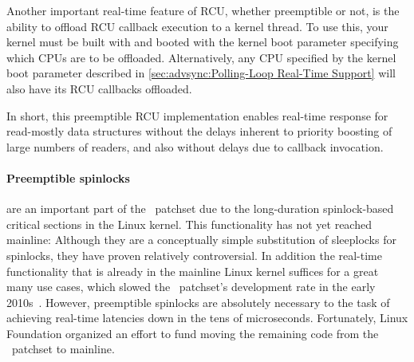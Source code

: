 \QuickQuizEnd

Another important real-time feature of RCU, whether preemptible or
not, is the ability to offload RCU callback execution to a kernel
thread.
To use this, your kernel must be built with 
and booted with the  kernel boot parameter specifying
which CPUs are to be offloaded.
Alternatively, any CPU specified by the  kernel boot parameter
described in
\cref{sec:advsync:Polling-Loop Real-Time Support}
will also have its RCU callbacks offloaded.

In short, this preemptible RCU implementation enables real-time response for
read-mostly data structures without the delays inherent to priority
boosting of large numbers of readers, and also without delays due to
callback invocation.

\paragraph{Preemptible spinlocks}
are an important part of the \rt\ patchset due to the long-duration
spinlock-based critical sections in the Linux kernel.
This functionality has not yet reached mainline: Although they are a
conceptually simple substitution of sleeplocks for spinlocks, they have
proven relatively controversial.
In addition the real-time functionality that is already in the mainline
Linux kernel suffices for a great many use cases, which slowed the \rt\
patchset's development rate in the early
2010s~\cite{JakeEdge2013Future-rtLinux,JakeEdge2014Future-rtLinux}.
However, preemptible spinlocks are absolutely necessary to the task of
achieving real-time latencies down in the tens of microseconds.
Fortunately, Linux Foundation organized an effort to fund moving the
remaining code from the \rt\ patchset to mainline.

